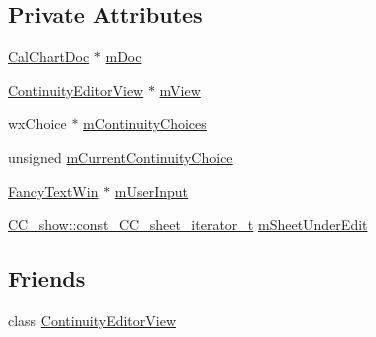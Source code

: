 \subsection*{Private Attributes}
\begin{DoxyCompactItemize}
\item 
\hyperlink{a00020}{Cal\-Chart\-Doc} $\ast$ \hyperlink{a00059_a9df4640d3225da11c158d3ae43919383}{m\-Doc}
\item 
\hyperlink{a00060}{Continuity\-Editor\-View} $\ast$ \hyperlink{a00059_a8ad7327450c133c44597a8118ffb763d}{m\-View}
\item 
wx\-Choice $\ast$ \hyperlink{a00059_ab4ab21c86c7773f0bb18f950a65a3acc}{m\-Continuity\-Choices}
\item 
unsigned \hyperlink{a00059_a1aac5b2bb163261ad3b9282a259de30f}{m\-Current\-Continuity\-Choice}
\item 
\hyperlink{a00099}{Fancy\-Text\-Win} $\ast$ \hyperlink{a00059_a31dc18431e666579860cadbffd361617}{m\-User\-Input}
\item 
\hyperlink{a00046_aaaf1345012d2f833d1c8f28f9b8593ff}{C\-C\-\_\-show\-::const\-\_\-\-C\-C\-\_\-sheet\-\_\-iterator\-\_\-t} \hyperlink{a00059_a3da0ebb4353b7676a0e1423048f775b9}{m\-Sheet\-Under\-Edit}
\end{DoxyCompactItemize}
\subsection*{Friends}
\begin{DoxyCompactItemize}
\item 
class \hyperlink{a00059_a104d1ac9772fb7de9d6d97f14589005a}{Continuity\-Editor\-View}
\end{DoxyCompactItemize}


